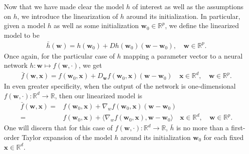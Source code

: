 \documentclass{article}
\begin{document}
Now that we have made clear the model $h$ of interest as well as the assumptions on $h$, we introduce the linearization of $h$ around its initialization. In particular, given a model $h$ as well as some initialization $\boldsymbol{w}_0 \in \mathbb{R}^p$, we define the linearized model to be 
\begin{align}
\bar{h}(\boldsymbol{w}) = h(\boldsymbol{w}_0) + Dh(\boldsymbol{w}_0)(\boldsymbol{w} - \boldsymbol{w}_0), \quad \boldsymbol{w} \in \mathbb{R}^p\label{linearizedmodel}.
\end{align}
Once again, for the particular case of $h$ mapping a parameter vector to a neural network $h: \boldsymbol{w} \mapsto f(\boldsymbol{w}, \cdot)$, we get
\begin{align*}
    \bar{f}(\boldsymbol{w}, \boldsymbol{x}) = f(\boldsymbol{w}_0, \boldsymbol{x}) + D_{\boldsymbol{w}} f(\boldsymbol{w}_0, \boldsymbol{x})(\boldsymbol{w} - \boldsymbol{w}_0) \quad \boldsymbol{x} \in \mathbb{R}^d, \quad \boldsymbol{w} \in \mathbb{R}^p. 
\end{align*}
In even greater specificity, when the output of the network is one-dimensional $f(\boldsymbol{w}, \cdot): \mathbb{R}^d \rightarrow \mathbb{R}$, then our linearized model is
\begin{align}
    \bar{f}(\boldsymbol{w}, \boldsymbol{x}) =& f(\boldsymbol{w}_0, \boldsymbol{x}) + \nabla_w f(\boldsymbol{w}_0, \boldsymbol{x})(\boldsymbol{w} - \boldsymbol{w}_0) \nonumber\\
    =& f(\boldsymbol{w}_0, \boldsymbol{x}) + \langle \nabla_w f(\boldsymbol{w}_0, \boldsymbol{x}), \boldsymbol{w} - \boldsymbol{w}_0 \rangle \quad \boldsymbol{x} \in \mathbb{R}^d, \quad \boldsymbol{w} \in \mathbb{R}^p\label{linearizednetwork}.
\end{align}
One will discern that for this case of $f(\boldsymbol{w}, \cdot): \mathbb{R}^d \rightarrow \mathbb{R}$, $\bar{h}$ is no more than a first-order Taylor expansion of the model $h$ around its initialization $\boldsymbol{w}_0$ for each fixed $\boldsymbol{x} \in \mathbb{R}^d$.
\end{document}
